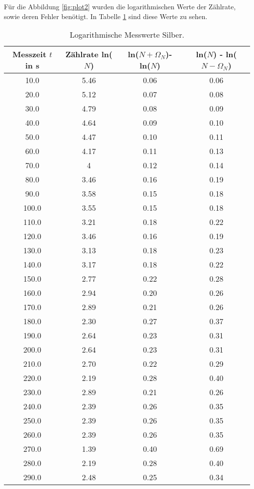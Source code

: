 Für die Abbildung \ref{fig:plot2} wurden die logarithmischen Werte der Zählrate, sowie deren Fehler benötigt.
In Tabelle \ref{tab:lnN2} sind diese Werte zu sehen.

\begin{table}
  \centering
  \caption{Logarithmische Messwerte Silber.}
  \label{tab:lnN2}
\begin{tabular}{c c c c}
  \toprule
  Messzeit $t$ in s & Zählrate ln($N$) & ln($N + \Omega_N$)- ln($N$) & ln($N$) - ln($N - \Omega_N$)\\
  \midrule
  10.0 & 5.46 & 0.06 & 0.06 \\
  20.0 & 5.12 & 0.07 & 0.08 \\
  30.0 & 4.79 & 0.08 & 0.09 \\
  40.0 & 4.64 & 0.09 & 0.10 \\
  50.0 & 4.47 & 0.10 & 0.11 \\
  60.0 & 4.17 & 0.11 & 0.13 \\
  70.0 & 4 & 0.12 & 0.14 \\
  80.0 & 3.46 & 0.16 & 0.19 \\
  90.0 & 3.58 & 0.15 & 0.18 \\
  100.0 & 3.55 & 0.15 & 0.18 \\
  110.0 & 3.21 & 0.18 & 0.22 \\
  120.0 & 3.46 & 0.16 & 0.19 \\
  130.0 & 3.13& 0.18 & 0.23 \\
  140.0 & 3.17 & 0.18 & 0.22 \\
  150.0 & 2.77 & 0.22 & 0.28 \\
  160.0 & 2.94 & 0.20 & 0.26 \\
  170.0 & 2.89 & 0.21 & 0.26 \\
  180.0 & 2.30 & 0.27 & 0.37 \\
  190.0 & 2.64 & 0.23 & 0.31 \\
  200.0 & 2.64 & 0.23 & 0.31 \\
  210.0 & 2.70 & 0.22 & 0.29 \\
  220.0 & 2.19 & 0.28 & 0.40 \\
  230.0 & 2.89 & 0.21 & 0.26 \\
  240.0 & 2.39 & 0.26 & 0.35 \\
  250.0 & 2.39 & 0.26 & 0.35 \\
  260.0 & 2.39 & 0.26 & 0.35 \\
  270.0 & 1.39 & 0.40 & 0.69 \\
  280.0 & 2.19 & 0.28 & 0.40 \\
  290.0 & 2.48 & 0.25 & 0.34 \\

\end{tabular}
\end{table}
